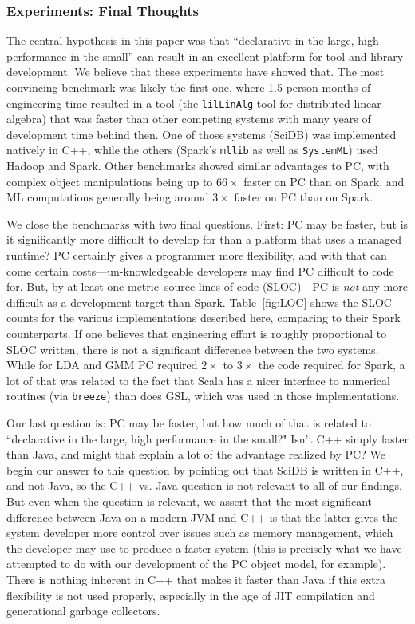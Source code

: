 \subsubsection{Experiments: Final Thoughts}

The central hypothesis in this paper was that ``declarative in the large, high-performance in the small'' can result
in an excellent platform for tool and library development.  We believe that these experiments have showed that.  The
most convincing benchmark was likely the first one, where 1.5 person-months of engineering time resulted in a tool
(the \texttt{lilLinAlg} tool for distributed linear algebra) that 
was faster than other competing systems with many years of development time behind then.  One of those systems (SciDB)
was implemented natively in C++, while the others (Spark's \texttt{mllib} as well as \texttt{SystemML}) used Hadoop and Spark.  
Other benchmarks showed similar advantages to PC, with complex object manipulations being 
up to $66 \times$ faster on PC than on Spark, and ML computations generally being around $3 \times$ faster on PC than on Spark.

We close the benchmarks with two final questions.  First: PC may be faster, but is it significantly more difficult to develop
for than a platform that uses a managed runtime?  PC certainly gives a programmer more flexibility, and with that can come
certain costs---un-knowledgeable developers may find PC difficult to code for.  But, by at least one metric--source
lines of code (SLOC)---PC is \emph{not}
any more difficult as a development target than Spark.
Table~\ref{fig:LOC} shows the SLOC counts for the various implementations described here, comparing to their Spark counterparts.
If one believes that engineering effort is roughly proportional to SLOC written, there is not a significant
difference between the two
systems.  
While for LDA and GMM PC required $2\times$ to $3\times$ the code required for Spark, a lot of that was related
to the fact that Scala has a nicer interface to numerical routines (via \texttt{breeze}) 
than does GSL, which was used in those
implementations.

Our last question is: PC may be faster, but how much of that is related to ``declarative in the large, high performance in 
the small?"   Isn't C++ simply faster than Java, and might that explain a lot of the advantage realized by PC?  We begin
our answer to this question by pointing out that SciDB is written in C++, and not Java, so the C++ vs. Java question is not 
relevant to all of our findings.
But even when the question is relevant, we assert that the most significant
difference between Java on a modern JVM and C++ is that the latter
gives the system developer more control over issues such as memory management, 
which the developer may use to produce a faster system (this is precisely
what we have attempted to do with our development of the PC object model, for example).  
There is nothing inherent in C++ that makes it faster than Java if this extra flexibility is not used properly, 
especially in the age of
JIT compilation and generational garbage collectors.  


